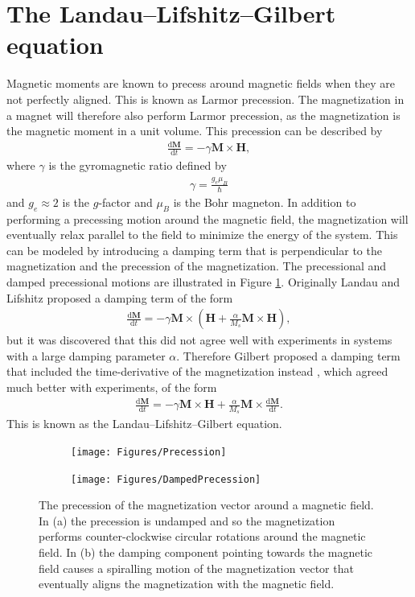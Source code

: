 \documentclass[12pt, a4paper, twoside, openright]{report}
\numberwithin{equation}{chapter}
\numberwithin{figure}{chapter}
\numberwithin{table}{chapter}
\begin{document}
\section{The Landau--Lifshitz--Gilbert equation}
Magnetic moments are known to precess around magnetic fields when they are not perfectly aligned. This is known as Larmor precession. The magnetization in a magnet will therefore also perform Larmor precession, as the magnetization is the magnetic moment in a unit volume. This precession can be described by
\begin{align}
\frac{\textrm{d}\mathbold{M}}{\textrm{d}t} = -\gamma\mathbold{M}\times\mathbold{H},
\end{align}
where $\gamma$ is the gyromagnetic ratio defined by
\begin{align}
\gamma = \frac{g_e\mu_B}{\hbar}
\end{align}
and $g_e \approx 2$ is the $g$-factor and $\mu_B$ is the Bohr magneton. In addition to performing a precessing motion around the magnetic field, the magnetization will eventually relax parallel to the field to minimize the energy of the system. This can be modeled by introducing a damping term that is perpendicular to the magnetization and the precession of the magnetization. The precessional and damped precessional motions are illustrated in Figure \ref{fig:Precessions}. Originally Landau and Lifshitz proposed \cite{LandauLifshitz1935} a damping term of the form
\begin{align}
\frac{\textrm{d}\mathbold{M}}{\textrm{d}t} = -\gamma\mathbold{M}\times(\mathbold{H}+\frac{\alpha}{M_s}\mathbold{M}\times\mathbold{H}),
\end{align}
but it was discovered that this did not agree well with experiments in systems with a large damping parameter $\alpha$. Therefore Gilbert proposed a damping term that included the time-derivative of the magnetization instead \cite{Gilbert2004Classics}, which agreed much better with experiments, of the form
\begin{align}
\label{eq:LLG}
\frac{\textrm{d}\mathbold{M}}{\textrm{d}t} = -\gamma\mathbold{M}\times\mathbold{H}+\frac{\alpha}{M_s}\mathbold{M}\times\frac{\textrm{d}\mathbold{M}}{\textrm{d}t}.
\end{align}
This is known as the Landau--Lifshitz--Gilbert equation.
\begin{figure}[h!]
\centering
\begin{subfigure}{.3\textwidth}
  \centering
  \texttt{[image: Figures/Precession]}
  \caption{}
\end{subfigure}%
\hspace{1cm}
\begin{subfigure}{.33\textwidth}
  \centering
  \texttt{[image: Figures/DampedPrecession]}
  \caption{}
\end{subfigure}
\caption{The precession of the magnetization vector around a magnetic field. In (a) the precession is undamped and so the magnetization performs counter-clockwise circular rotations around the magnetic field. In (b) the damping component pointing towards the magnetic field causes a spiralling motion of the magnetization vector that eventually aligns the magnetization with the magnetic field.}
\label{fig:Precessions}
\end{figure}
\end{document}
